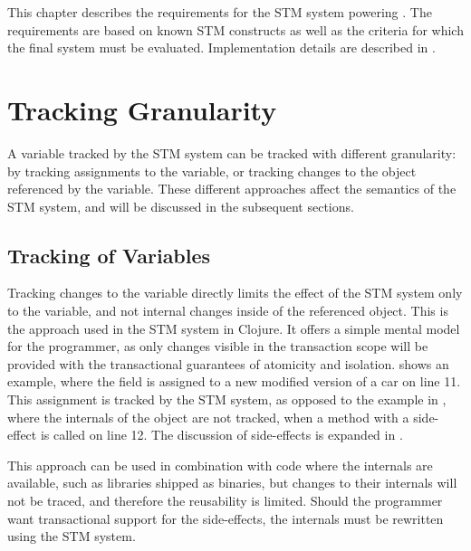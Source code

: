 \makeatletter {}\makeatother
{}
This chapter describes the requirements for the \ac{STM} system powering \stmname. The requirements are based on known \ac{STM} constructs as well as the criteria for which the final system must be evaluated. Implementation details are described in .
\label{sec:stm_requirements}

\section{Tracking Granularity}\label{sec:tracking}
A variable tracked by the \ac{STM} system can be tracked with different granularity: by tracking assignments to the variable, or tracking changes to the object referenced by the variable. These different approaches affect the semantics of the \ac{STM} system, and will be discussed in the subsequent sections.

\subsection{Tracking of Variables} 
Tracking changes to the variable directly limits the effect of the \ac{STM} system only to the variable, and not internal changes inside of the referenced object. This is the approach used in the \ac{STM} system in Clojure\cite{clojureConcurrent}. It offers a simple mental model for the programmer, as only changes visible in the transaction scope will be provided with the transactional guarantees of atomicity and isolation.   shows an example, where the field  is assigned to a new modified version of a car on line 11. This assignment is tracked by the \ac{STM} system, as opposed to the example in , where the internals of the object are not tracked, when a method with a side-effect is called on line 12. The discussion of side-effects is expanded in .

This approach can be used in combination with code where the internals are available, such as libraries shipped as binaries, but changes to their internals will not be traced, and therefore the reusability is limited. Should the programmer want transactional support for the side-effects, the internals must be rewritten using the \ac{STM} system.

